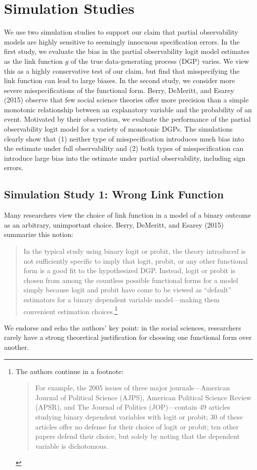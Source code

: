 \documentclass[10pt]{article}
\begin{document}
\section*{Simulation Studies}

We use two simulation studies to support our claim that partial observability models are highly sensitive to seemingly innocuous specification errors. 
In the first study, we evaluate the bias in the partial observability logit model estimates as the link function $g$ of the true data-generating process (DGP) varies. 
We view this as a highly conservative test of our claim, but find that misspecifying the link function can lead to large biases. 
In the second study, we consider more severe misspecifications of the functional form. 
Berry, DeMeritt, and Esarey (2015) observe that few social science theories offer more precision than a simple monotonic relationship between an explanatory variable and the probability of an event. 
Motivated by their observation, we evaluate the performance of the partial observability logit model for a variety of monotonic DGPs.
The simulations clearly show that (1) neither type of misspecification introduces much bias into the estimate under full observability and (2) both types of misspecification can introduce large bias into the estimate under partial observability, including sign errors.

\subsection*{Simulation Study 1: Wrong Link Function}

Many researchers view the choice of link function in a model of a binary outcome as an arbitrary, unimportant choice. 
Berry, DeMeritt, and Esarey (2015) summarize this notion:
\begin{quote}
In the typical study using binary logit or probit, the theory introduced is not sufficiently specific to imply that logit, probit, or any other functional form is a good fit to the hypothesized DGP. 
Instead, logit or probit is chosen from among the countless possible functional forms for a model simply because logit and probit have come to be viewed as ``default'' estimators for a binary dependent variable model---making them convenient estimation choices.\footnote{The authors continue in a footnote:
\begin{quote}
For example, the 2005 issues of three major journals---American Journal of Political Science (AJPS), American Political Science Review (APSR), and The Journal of Politics (JOP)---contain 49 articles studying binary dependent variables with logit or probit; 30 of these articles offer no defense for their choice of logit or probit; ten other papers defend their choice, but solely by noting that the dependent variable is dichotomous. 
\end{quote}}
\end{quote}
We endorse and echo the authors' key point: in the social sciences, researchers rarely have a strong theoretical justification for choosing one functional form over another. 
\end{document}
